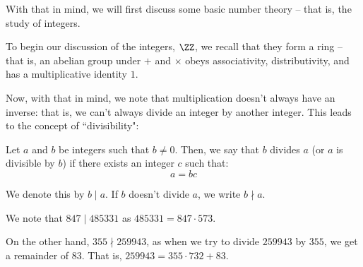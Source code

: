 \documentclass[openany]{book}
\begin{document}
With that in mind, we will first discuss some basic number theory -- that is, the study of integers.

To begin our discussion of the integers, $\ZZ$, we recall that they form a ring -- that is, an abelian group under $+$ and $\times$ obeys associativity, distributivity, and has a multiplicative identity $1$.

Now, with that in mind, we note that multiplication doesn't always have an inverse: that is, we can't always divide an integer by another integer. This leads to the concept of ``divisibility":

\begin{defn}
	Let $a$ and $b$ be integers such that $b \neq 0$. Then, we say that $b$ divides $a$ (or $a$ is divisible by $b$) if there exists an integer $c$ such that:
	\begin{equation*}
		a = bc
	\end{equation*}
	
	We denote this by $b \mid a$. If $b$ doesn't divide $a$, we write $b \nmid a$.
\end{defn}

\label{ex:1.6}\begin{example}
	We note that $847 \mid 485331$ as $485331 = 847 \cdot 573$.
	
	On the other hand, $355 \nmid 259943$, as when we try to divide $259943$ by $355$, we get a remainder of $83$. That is, $259943 = 355 \cdot 732 + 83$.
\end{example}
\end{document}
